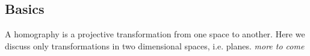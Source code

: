 \subsection{Basics}
A homography is a projective transformation from one space to another.  Here we
discuss only transformations in two dimensional spaces, i.e. planes.
\newline \emph{more to come}
